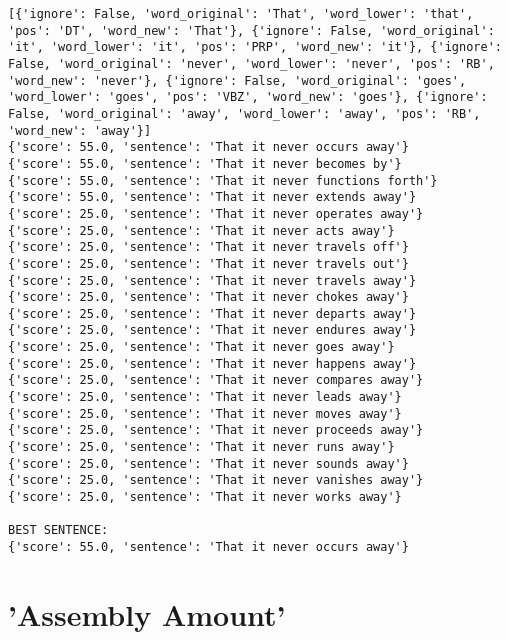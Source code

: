 \documentclass[12pt,a4paper,oneside]{book}
\begin{document}
\begin{verbatim}
[{'ignore': False, 'word_original': 'That', 'word_lower': 'that', 'pos': 'DT', 'word_new': 'That'}, {'ignore': False, 'word_original': 'it', 'word_lower': 'it', 'pos': 'PRP', 'word_new': 'it'}, {'ignore': False, 'word_original': 'never', 'word_lower': 'never', 'pos': 'RB', 'word_new': 'never'}, {'ignore': False, 'word_original': 'goes', 'word_lower': 'goes', 'pos': 'VBZ', 'word_new': 'goes'}, {'ignore': False, 'word_original': 'away', 'word_lower': 'away', 'pos': 'RB', 'word_new': 'away'}]
{'score': 55.0, 'sentence': 'That it never occurs away'}
{'score': 55.0, 'sentence': 'That it never becomes by'}
{'score': 55.0, 'sentence': 'That it never functions forth'}
{'score': 55.0, 'sentence': 'That it never extends away'}
{'score': 25.0, 'sentence': 'That it never operates away'}
{'score': 25.0, 'sentence': 'That it never acts away'}
{'score': 25.0, 'sentence': 'That it never travels off'}
{'score': 25.0, 'sentence': 'That it never travels out'}
{'score': 25.0, 'sentence': 'That it never travels away'}
{'score': 25.0, 'sentence': 'That it never chokes away'}
{'score': 25.0, 'sentence': 'That it never departs away'}
{'score': 25.0, 'sentence': 'That it never endures away'}
{'score': 25.0, 'sentence': 'That it never goes away'}
{'score': 25.0, 'sentence': 'That it never happens away'}
{'score': 25.0, 'sentence': 'That it never compares away'}
{'score': 25.0, 'sentence': 'That it never leads away'}
{'score': 25.0, 'sentence': 'That it never moves away'}
{'score': 25.0, 'sentence': 'That it never proceeds away'}
{'score': 25.0, 'sentence': 'That it never runs away'}
{'score': 25.0, 'sentence': 'That it never sounds away'}
{'score': 25.0, 'sentence': 'That it never vanishes away'}
{'score': 25.0, 'sentence': 'That it never works away'}

BEST SENTENCE:
{'score': 55.0, 'sentence': 'That it never occurs away'}

\end{verbatim}


\chapter*{'Assembly Amount'}
\end{document}
